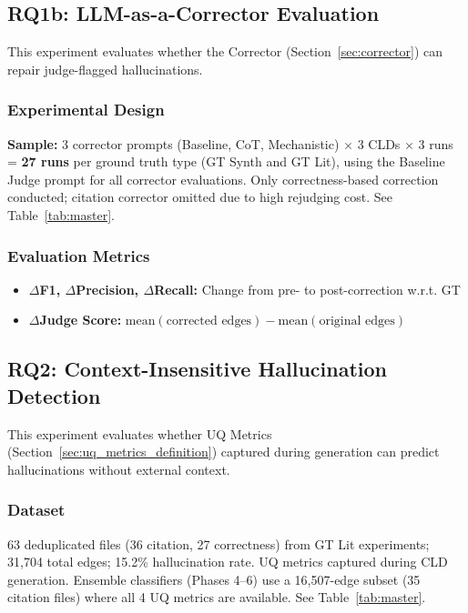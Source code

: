 \subsection{RQ1b: LLM-as-a-Corrector Evaluation}

This experiment evaluates whether the Corrector (Section~\ref{sec:corrector}) can repair judge-flagged hallucinations.

\subsubsection{Experimental Design}
\textbf{Sample:} 3 corrector prompts (Baseline, CoT, Mechanistic) $\times$ 3 CLDs $\times$ 3 runs = \textbf{27 runs} per ground truth type (GT Synth and GT Lit), using the Baseline Judge prompt for all corrector evaluations. Only correctness-based correction conducted; citation corrector omitted due to high rejudging cost. See Table~\ref{tab:master}.

\subsubsection{Evaluation Metrics}
\begin{itemize}[noitemsep]
    \item \textbf{$\Delta$F1, $\Delta$Precision, $\Delta$Recall:} Change from pre- to post-correction w.r.t. GT
    \item \textbf{$\Delta$Judge Score:} $\text{mean}(\text{corrected edges}) - \text{mean}(\text{original edges})$
\end{itemize}

\subsection{RQ2: Context-Insensitive Hallucination Detection}

This experiment evaluates whether UQ Metrics (Section~\ref{sec:uq_metrics_definition}) captured during generation can predict hallucinations without external context.

\subsubsection{Dataset}
63 deduplicated files (36 citation, 27 correctness) from GT Lit experiments; 31,704 total edges; 15.2\% hallucination rate. UQ metrics captured during CLD generation. Ensemble classifiers (Phases 4--6) use a 16,507-edge subset (35 citation files) where all 4 UQ metrics are available. See Table~\ref{tab:master}.

